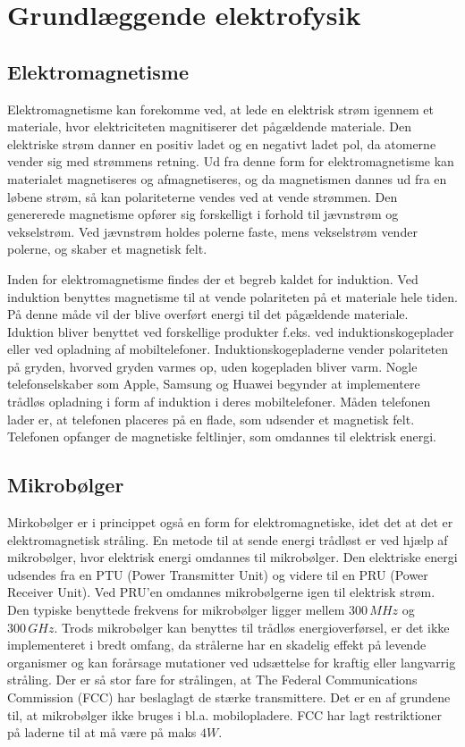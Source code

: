 \section{Grundlæggende elektrofysik}

\subsection{Elektromagnetisme}
Elektromagnetisme kan forekomme ved, at lede en elektrisk strøm igennem et materiale, hvor elektriciteten magnitiserer det pågældende materiale. Den elektriske strøm danner en positiv ladet og en negativt ladet pol, da atomerne vender sig med strømmens retning. Ud fra denne form for elektromagnetisme kan materialet magnetiseres og afmagnetiseres, og da magnetismen dannes ud fra en løbene strøm, så kan polariteterne vendes ved at vende strømmen. Den genererede magnetisme opfører sig forskelligt i forhold til jævnstrøm og vekselstrøm. Ved jævnstrøm holdes polerne faste, mens vekselstrøm vender polerne, og skaber et magnetisk felt.

Inden for elektromagnetisme findes der et begreb kaldet for induktion. Ved induktion benyttes magnetisme til at vende polariteten på et materiale hele tiden. På denne måde vil der blive overført energi til det pågældende materiale. Iduktion bliver benyttet ved forskellige produkter f.eks. ved induktionskogeplader eller ved opladning af mobiltelefoner. Induktionskogepladerne vender polariteten på gryden, hvorved gryden varmes op, uden kogepladen bliver varm. Nogle telefonselskaber som Apple, Samsung og Huawei begynder at implementere trådløs opladning i form af induktion i deres mobiltelefoner. Måden telefonen lader er, at telefonen placeres på en flade, som udsender et magnetisk felt. Telefonen opfanger de magnetiske feltlinjer, som omdannes til elektrisk energi.\cite{mikro}

\subsection{Mikrobølger}

Mirkobølger er i princippet også en form for elektromagnetiske, idet det at det er elektromagnetisk stråling. En metode til at sende energi trådløst er ved hjælp af mikrobølger, hvor elektrisk energi omdannes til mikrobølger. Den elektriske energi udsendes fra en PTU (Power Transmitter Unit) og videre til en PRU (Power Receiver Unit). Ved PRU'en omdannes mikrobølgerne igen til elektrisk strøm. Den typiske benyttede frekvens for mikrobølger ligger mellem $300 \, MHz$ og $300 \, GHz$. Trods mikrobølger kan benyttes til trådløs energioverførsel, er det ikke implementeret i bredt omfang, da strålerne har en skadelig effekt på levende organismer og kan forårsage mutationer ved udsættelse for kraftig eller langvarrig stråling. Der er så stor fare for strålingen, at The Federal Communications Commission (FCC) har beslaglagt de stærke transmittere. Det er en af grundene til, at mikrobølger ikke bruges i bl.a. mobilopladere. FCC har lagt restriktioner på laderne til at må være på maks $4 W$. \cite{mikro}

\newpage
